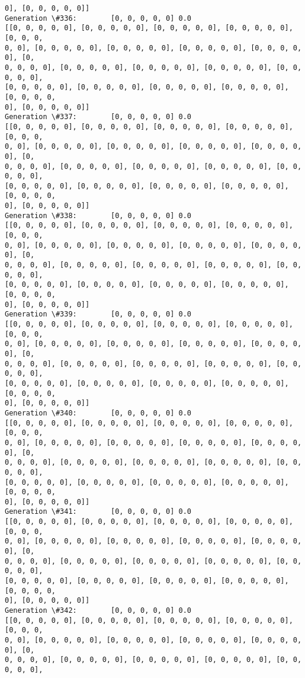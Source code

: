 \documentclass[11pt]{article}
\begin{document}
\begin{Verbatim}[commandchars=\\\{\}]
0], [0, 0, 0, 0, 0]]
Generation \#336:        [0, 0, 0, 0, 0] 0.0
[[0, 0, 0, 0, 0], [0, 0, 0, 0, 0], [0, 0, 0, 0, 0], [0, 0, 0, 0, 0], [0, 0, 0,
0, 0], [0, 0, 0, 0, 0], [0, 0, 0, 0, 0], [0, 0, 0, 0, 0], [0, 0, 0, 0, 0], [0,
0, 0, 0, 0], [0, 0, 0, 0, 0], [0, 0, 0, 0, 0], [0, 0, 0, 0, 0], [0, 0, 0, 0, 0],
[0, 0, 0, 0, 0], [0, 0, 0, 0, 0], [0, 0, 0, 0, 0], [0, 0, 0, 0, 0], [0, 0, 0, 0,
0], [0, 0, 0, 0, 0]]
Generation \#337:        [0, 0, 0, 0, 0] 0.0
[[0, 0, 0, 0, 0], [0, 0, 0, 0, 0], [0, 0, 0, 0, 0], [0, 0, 0, 0, 0], [0, 0, 0,
0, 0], [0, 0, 0, 0, 0], [0, 0, 0, 0, 0], [0, 0, 0, 0, 0], [0, 0, 0, 0, 0], [0,
0, 0, 0, 0], [0, 0, 0, 0, 0], [0, 0, 0, 0, 0], [0, 0, 0, 0, 0], [0, 0, 0, 0, 0],
[0, 0, 0, 0, 0], [0, 0, 0, 0, 0], [0, 0, 0, 0, 0], [0, 0, 0, 0, 0], [0, 0, 0, 0,
0], [0, 0, 0, 0, 0]]
Generation \#338:        [0, 0, 0, 0, 0] 0.0
[[0, 0, 0, 0, 0], [0, 0, 0, 0, 0], [0, 0, 0, 0, 0], [0, 0, 0, 0, 0], [0, 0, 0,
0, 0], [0, 0, 0, 0, 0], [0, 0, 0, 0, 0], [0, 0, 0, 0, 0], [0, 0, 0, 0, 0], [0,
0, 0, 0, 0], [0, 0, 0, 0, 0], [0, 0, 0, 0, 0], [0, 0, 0, 0, 0], [0, 0, 0, 0, 0],
[0, 0, 0, 0, 0], [0, 0, 0, 0, 0], [0, 0, 0, 0, 0], [0, 0, 0, 0, 0], [0, 0, 0, 0,
0], [0, 0, 0, 0, 0]]
Generation \#339:        [0, 0, 0, 0, 0] 0.0
[[0, 0, 0, 0, 0], [0, 0, 0, 0, 0], [0, 0, 0, 0, 0], [0, 0, 0, 0, 0], [0, 0, 0,
0, 0], [0, 0, 0, 0, 0], [0, 0, 0, 0, 0], [0, 0, 0, 0, 0], [0, 0, 0, 0, 0], [0,
0, 0, 0, 0], [0, 0, 0, 0, 0], [0, 0, 0, 0, 0], [0, 0, 0, 0, 0], [0, 0, 0, 0, 0],
[0, 0, 0, 0, 0], [0, 0, 0, 0, 0], [0, 0, 0, 0, 0], [0, 0, 0, 0, 0], [0, 0, 0, 0,
0], [0, 0, 0, 0, 0]]
Generation \#340:        [0, 0, 0, 0, 0] 0.0
[[0, 0, 0, 0, 0], [0, 0, 0, 0, 0], [0, 0, 0, 0, 0], [0, 0, 0, 0, 0], [0, 0, 0,
0, 0], [0, 0, 0, 0, 0], [0, 0, 0, 0, 0], [0, 0, 0, 0, 0], [0, 0, 0, 0, 0], [0,
0, 0, 0, 0], [0, 0, 0, 0, 0], [0, 0, 0, 0, 0], [0, 0, 0, 0, 0], [0, 0, 0, 0, 0],
[0, 0, 0, 0, 0], [0, 0, 0, 0, 0], [0, 0, 0, 0, 0], [0, 0, 0, 0, 0], [0, 0, 0, 0,
0], [0, 0, 0, 0, 0]]
Generation \#341:        [0, 0, 0, 0, 0] 0.0
[[0, 0, 0, 0, 0], [0, 0, 0, 0, 0], [0, 0, 0, 0, 0], [0, 0, 0, 0, 0], [0, 0, 0,
0, 0], [0, 0, 0, 0, 0], [0, 0, 0, 0, 0], [0, 0, 0, 0, 0], [0, 0, 0, 0, 0], [0,
0, 0, 0, 0], [0, 0, 0, 0, 0], [0, 0, 0, 0, 0], [0, 0, 0, 0, 0], [0, 0, 0, 0, 0],
[0, 0, 0, 0, 0], [0, 0, 0, 0, 0], [0, 0, 0, 0, 0], [0, 0, 0, 0, 0], [0, 0, 0, 0,
0], [0, 0, 0, 0, 0]]
Generation \#342:        [0, 0, 0, 0, 0] 0.0
[[0, 0, 0, 0, 0], [0, 0, 0, 0, 0], [0, 0, 0, 0, 0], [0, 0, 0, 0, 0], [0, 0, 0,
0, 0], [0, 0, 0, 0, 0], [0, 0, 0, 0, 0], [0, 0, 0, 0, 0], [0, 0, 0, 0, 0], [0,
0, 0, 0, 0], [0, 0, 0, 0, 0], [0, 0, 0, 0, 0], [0, 0, 0, 0, 0], [0, 0, 0, 0, 0],

\end{Verbatim}
\end{document}
